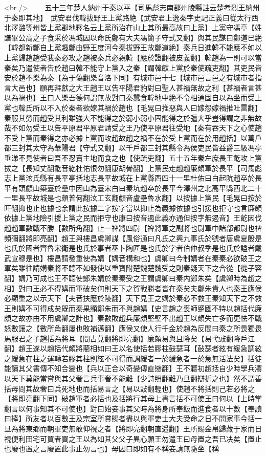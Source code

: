 <br />
　　五十三年楚人納州于秦以平【司馬彪志南郡州陵縣註云楚考烈王納州于秦即其地】　武安君伐韓拔野王上黨路絶【武安君上逸秦字史記正義曰從太行西北澤潞等州皆上黨郡地釋名云上黨所治在山上其所最高故曰上黨】上黨守馮亭【姓譜畢公高之子食采於馮城因以命氏鄭有大夫馮簡子守式又翻】與其民謀曰鄭道已絶【韓都新鄭自上黨趣鄭由野王度河今秦拔野王故鄭道絶】秦兵日進韓不能應不如以上黨歸趙趙受我秦必攻之趙被秦兵必親韓【應於證翻被皮義翻】韓趙為一則可以當秦矣乃遣使者告於趙曰韓不能守上黨入之秦【謂韓獻上黨於秦使疏吏翻】其吏民皆安於趙不樂為秦【為于偽翻樂音洛下同】有城市邑十七【城市邑言邑之有城市者指言大邑也】願再拜獻之大王趙王以告平陽君豹對曰聖人甚禍無故之利【甚禍者言甚以為禍也】王曰人樂吾德何謂無故對曰秦蠶食韓地中絶不令相通固自以為坐而受上黨也韓氏所以不入於秦者欲嫁其禍於趙也【毛晃曰推惡與人曰嫁怨嫁禍推吐雷翻】秦服其勞而趙受其利雖強大不能得之於弱小弱小固能得之於彊大乎豈得謂之非無故哉不如勿受王以告平原君平原君請受之王乃使平原君往受地【秦有吞天下之心使趙不受上黨而秦得之亦必據上黨而攻趙故趙之禍不在於受上黨而在於用趙括】以萬戶都三封其太守為華陽君【守式又翻】以千戶都三封其縣令為侯吏民皆益爵三級馮亭垂涕不見使者曰吾不忍賣主地而食之也【使疏吏翻】五十五年秦左庶長王齕攻上黨拔之【長知丈翻齕音紇杜佑恨勿翻康胡骨翻】上黨民走趙趙廉頗軍於長平【司馬彪志上黨泫氏縣有長平亭括地志長平故城在上黨縣西四十一里杜佑曰白起阬趙卒於長平有頭顱山築臺於壘中因山為臺宋白曰秦坑趙卒於長平今澤州之北高平縣西北二十一里長平故城是也頗普何翻泫工玄翻顱音盧壘魯水翻】以按據上黨民【毛晃曰按於旰翻抑也止也據也余謂此按據二字按字當以抑止為義據依據也引援也拒守也言廉頗依據上黨地險引援上黨之民而拒守也康曰按音遏此義亦通但按字無遏音】王齕因伐趙趙軍數戰不勝【數所角翻】止一禆將四尉【禆將軍之副將也尉軍中諸部都尉也禆頻彌翻將即亮翻】趙王與樓昌虞卿謀【風俗通曰凡氏之興九事氏於號者唐虞夏殷是也氏於國者齊魯宋衛是也氏於事者巫卜陶匠是也氏於字者伯仲叔季是也氏於謚者戴武宣穆是也】樓昌請發重使為媾【媾音構和也】虞卿曰今制媾者在秦秦必欲破王之軍矣雖往請媾秦將不聼不如發使以重寶附楚魏楚魏受之則秦疑天下之合從【從子容翻】媾乃可成也王不聼使鄭朱媾於秦秦受之王謂虞卿曰秦内鄭朱矣【虞卿時為趙之相】對曰王必不得媾而軍破矣何則天下之賀戰勝者皆在秦矣夫鄭朱貴人也秦王應侯必顯重之以示天下【夫音扶應於陵翻】天下見王之媾於秦必不救王秦知天下之不救王則媾不可得成矣既而秦果顯鄭朱而不與趙媾【史言趙之喪師蹙國不特以趙括代廉頗之故亦由不用虞卿之計也】秦數敗趙兵廉頗堅壁不出趙王以頗失亡多而更怯不戰怒數讓之【數所角翻屢也敗補邁翻】應侯又使人行千金於趙為反間曰秦之所畏獨畏馬服君之子趙括為將耳【間古莧翻將即亮翻】廉頗易與且降矣【易弋䜴翻降戶江翻】趙王遂以趙括代頗將藺相如曰王以名使括若膠柱鼓瑟耳【鼔瑟者絃有緩急調絃之緩急在柱之運轉若膠其柱則絃不可得而調緩者一於緩急者一於急無活法矣】括徒能讀其父書傳不知合變也【兵以正合以奇變傳直戀翻】王不聼初趙括自少時學兵灋以天下莫能當嘗與其父奢言兵事奢不能難【少詩照翻難乃旦翻辯折之也】然不謂善括母問其故奢曰兵死地也而括易言之【易以䜴翻輕也】使趙不將括則己若必將之【將即亮翻下同】破趙軍者必括也及括將行其母上書言括不可使王曰何以【上時掌翻言以何事知其不可使也】對曰始妾事其父時為將身所奉飯而進食者以十數【奉讀曰捧】所友者以百數王及宗室所賞賜者盡以與軍吏士大夫受命之日不問家事今括一旦為將東鄉而朝軍吏無敢仰視之者【將即亮翻朝直遥翻】王所賜金帛歸藏于家而日視便利田宅可買者買之王以為如其父父子異心願王勿遣王曰母置之吾已决矣【置止也廢也置之言廢置此事止勿言也】母因曰即如有不稱妾請無隨坐【稱
